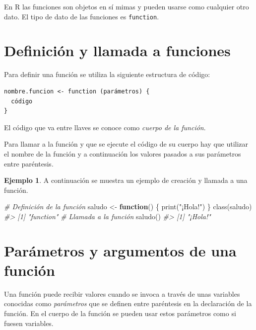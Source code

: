 \documentclass[
]{book}
\newenvironment{Shaded}{\begin{snugshade}}{\end{snugshade}}
\newcommand{\CommentTok}[1]{\textcolor[rgb]{0.56,0.35,0.01}{\textit{#1}}}
\newcommand{\ControlFlowTok}[1]{\textcolor[rgb]{0.13,0.29,0.53}{\textbf{#1}}}
\newcommand{\FunctionTok}[1]{\textcolor[rgb]{0.00,0.00,0.00}{#1}}
\newcommand{\NormalTok}[1]{#1}
\newcommand{\OtherTok}[1]{\textcolor[rgb]{0.56,0.35,0.01}{#1}}
\newcommand{\StringTok}[1]{\textcolor[rgb]{0.31,0.60,0.02}{#1}}
\theoremstyle{definition}
\theoremstyle{definition}
\newtheorem{example}{Ejemplo}[chapter]
\theoremstyle{definition}
\theoremstyle{definition}
\theoremstyle{remark}
\begin{document}
En R las funciones son objetos en sí mimas y pueden usarse como cualquier otro dato. El tipo de dato de las funciones es \texttt{function}.

\hypertarget{definiciuxf3n-y-llamada-a-funciones}{%
\section{Definición y llamada a funciones}\label{definiciuxf3n-y-llamada-a-funciones}}

Para definir una función se utiliza la siguiente estructura de código:

\begin{verbatim}
nombre.funcion <- function (parámetros) {
  código
}
\end{verbatim}

El código que va entre llaves se conoce como \emph{cuerpo de la función}.

Para llamar a la función y que se ejecute el código de su cuerpo hay que utilizar el nombre de la función y a continuación los valores pasados a sus parámetros entre paréntesis.

\begin{example}

A continuación se muestra un ejemplo de creación y llamada a una función.

\begin{Shaded}
\begin{Highlighting}[]
\CommentTok{\# Definición de la función}
\NormalTok{saludo }\OtherTok{\textless{}{-}} \ControlFlowTok{function}\NormalTok{() \{}
  \FunctionTok{print}\NormalTok{(}\StringTok{"¡Hola!"}\NormalTok{)}
\NormalTok{\}}
\FunctionTok{class}\NormalTok{(saludo)}
\CommentTok{\#\textgreater{} [1] "function"}
\CommentTok{\# Llamada a la función}
\FunctionTok{saludo}\NormalTok{()}
\CommentTok{\#\textgreater{} [1] "¡Hola!"}
\end{Highlighting}
\end{Shaded}

\end{example}

\hypertarget{paruxe1metros-y-argumentos-de-una-funciuxf3n}{%
\section{Parámetros y argumentos de una función}\label{paruxe1metros-y-argumentos-de-una-funciuxf3n}}

Una función puede recibir valores cuando se invoca a través de unas variables conocidas como \emph{parámetros} que se definen entre paréntesis en la declaración de la función. En el cuerpo de la función se pueden usar estos parámetros como si fuesen variables.
\end{document}
